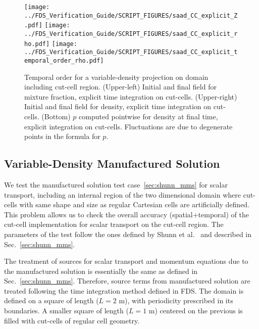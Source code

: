 \documentclass[11pt]{book}
\begin{document}
\begin{figure}[ht]
\centering
\texttt{[image: ../FDS\_Verification\_Guide/SCRIPT\_FIGURES/saad\_CC\_explicit\_Z.pdf]}
\texttt{[image: ../FDS\_Verification\_Guide/SCRIPT\_FIGURES/saad\_CC\_explicit\_rho.pdf]}
\texttt{[image: ../FDS\_Verification\_Guide/SCRIPT\_FIGURES/saad\_CC\_explicit\_temporal\_order\_rho.pdf]}
\caption[The  temporal order test case]{Temporal order for a variable-density projection on domain including cut-cell region.  (Upper-left) Initial and final field for mixture fraction, explicit time integration on cut-cells.  (Upper-right) Initial and final field for density, explicit time integration on cut-cells.  (Bottom) $p$ computed pointwise for density at final time, explicit integration on cut-cells. Fluctuations are due to degenerate points in the formula for $p$.}\label{fig:saad_cc_temporal_order}
\end{figure}


\subsection{Variable-Density Manufactured Solution}

\label{sec:shunn_cc_mms}


We test the manufactured solution test case~\ref{sec:shunn_mms} for scalar transport, including an internal region of the two dimensional domain where cut-cells with same shape and size as regular Cartesian cells are artificially defined. This problem allows us to check the overall accuracy (spatial+temporal) of the cut-cell implementation for scalar transport on the cut-cell region.
The parameters of the test follow the ones defined by Shunn et al.~\cite{Shunn:2012} and described in Sec.~\ref{sec:shunn_mms}.

The treatment of sources for scalar transport and momentum equations due to the manufactured solution is essentially the same as defined in Sec.~\ref{sec:shunn_mms}. Therefore, source terms from manufactured solution are treated following the time integration method defined in FDS.
The domain is defined on a square of length ($L=2$ m), with periodicity prescribed in its boundaries. A smaller square of length ($L=1$ m) centered on the previous is filled with cut-cells of regular cell geometry.
\end{document}
